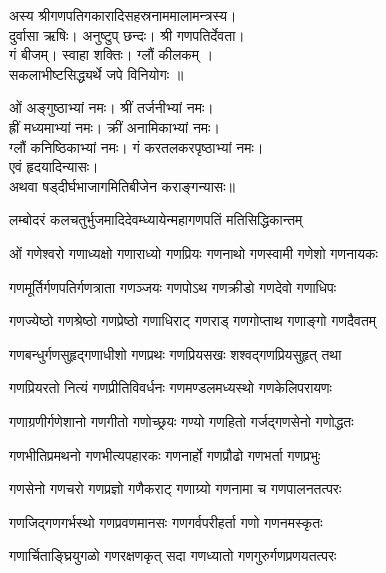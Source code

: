 

अस्य श्रीगणपतिगकारादिसहस्रनाममालामन्त्रस्य।\\
दुर्वासा ऋषिः। अनुष्टुप् छन्दः। श्री गणपतिर्देवता।\\
गं बीजम्। स्वाहा शक्तिः। ग्लौं कीलकम् ।\\
 सकलाभीष्टसिद्ध्यर्थे जपे विनियोगः ॥

ओं अङ्गुष्ठाभ्यां नमः। श्रीं तर्जनीभ्यां नमः।\\
ह्रीं मध्यमाभ्यां नमः। क्रीं अनामिकाभ्यां नमः।\\
ग्लौं कनिष्ठिकाभ्यां नमः। गं करतलकरपृष्ठाभ्यां नमः।\\
एवं हृदयादिन्यासः।\\
अथवा षड्दीर्घभाजागमितिबीजेन कराङ्गन्यासः॥


{लम्बोदरं कलचतुर्भुजमादिदेवम्}{ध्यायेन्महागणपतिं मतिसिद्धिकान्तम्}


\twolineshloka
{ओं गणेश्वरो गणाध्यक्षो गणाराध्यो गणप्रियः}
{गणनाथो गणस्वामी गणेशो गणनायकः}%

\twolineshloka
{गणमूर्तिर्गणपतिर्गणत्राता गणञ्जयः}%
{गणपोऽथ गणक्रीडो गणदेवो गणाधिपः}%

\twolineshloka
{गणज्येष्ठो गणश्रेष्ठो गणप्रेष्ठो गणाधिराट्}%
{गणराड् गणगोप्ताथ गणाङ्गो गणदैवतम्}%

\twolineshloka
{गणबन्धुर्गणसुहृद्गणाधीशो गणप्रथः}%
{गणप्रियसखः शश्वद्गणप्रियसुहृत् तथा}%

\twolineshloka
{गणप्रियरतो नित्यं गणप्रीतिविवर्धनः}%
{गणमण्डलमध्यस्थो गणकेलिपरायणः}%

\twolineshloka
{गणाग्रणीर्गणेशानो गणगीतो गणोच्छ्रयः}%
{गण्यो गणहितो गर्जद्गणसेनो गणोद्धतः}%

\twolineshloka
{गणभीतिप्रमथनो गणभीत्यपहारकः}%
{गणनार्हो गणप्रौढो गणभर्ता गणप्रभुः}%

\twolineshloka
{गणसेनो गणचरो गणप्रज्ञो गणैकराट्}%
{गणाग्र्यो गणनामा च गणपालनतत्परः}%

\twolineshloka
{गणजिद्गणगर्भस्थो गणप्रवणमानसः}%
{गणगर्वपरीहर्ता गणो गणनमस्कृतः}%

\twolineshloka
{गणार्चिताङ्घ्रियुगळो गणरक्षणकृत् सदा}%
{गणध्यातो गणगुरुर्गणप्रणयतत्परः}%

